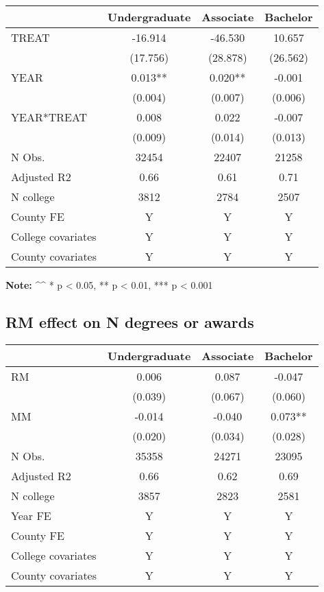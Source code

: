 \documentclass[
  landscape]{article}
\begin{document}
\begin{longtable}[]{@{}lccc@{}}
\toprule
& Undergraduate & Associate & Bachelor \\
\midrule
\endhead
TREAT & -16.914 & -46.530 & 10.657 \\
& (17.756) & (28.878) & (26.562) \\
YEAR & 0.013** & 0.020** & -0.001 \\
& (0.004) & (0.007) & (0.006) \\
YEAR*TREAT & 0.008 & 0.022 & -0.007 \\
& (0.009) & (0.014) & (0.013) \\
N Obs. & 32454 & 22407 & 21258 \\
Adjusted R2 & 0.66 & 0.61 & 0.71 \\
N college & 3812 & 2784 & 2507 \\
County FE & Y & Y & Y \\
College covariates & Y & Y & Y \\
County covariates & Y & Y & Y \\
\bottomrule
\end{longtable}

\textbf{Note:} \^{}\^{} * p \textless{} 0.05, ** p \textless{} 0.01, ***
p \textless{} 0.001

\newpage

\hypertarget{rm-effect-on-n-degrees-or-awards}{%
\subsection{RM effect on N degrees or
awards}\label{rm-effect-on-n-degrees-or-awards}}

\begin{longtable}[]{@{}lccc@{}}
\toprule
& Undergraduate & Associate & Bachelor \\
\midrule
\endhead
RM & 0.006 & 0.087 & -0.047 \\
& (0.039) & (0.067) & (0.060) \\
MM & -0.014 & -0.040 & 0.073** \\
& (0.020) & (0.034) & (0.028) \\
N Obs. & 35358 & 24271 & 23095 \\
Adjusted R2 & 0.66 & 0.62 & 0.69 \\
N college & 3857 & 2823 & 2581 \\
Year FE & Y & Y & Y \\
County FE & Y & Y & Y \\
College covariates & Y & Y & Y \\
County covariates & Y & Y & Y \\
\bottomrule
\end{longtable}
\end{document}
